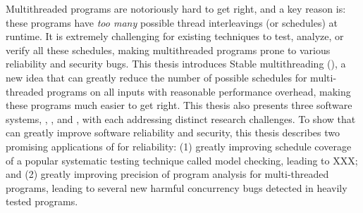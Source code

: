 Multithreaded programs are notoriously hard to get right, and a key reason is: these programs have \emph{too many} possible thread interleavings (or schedules) at runtime. It is extremely challenging for existing techniques to test, analyze, or verify all these schedules, making multithreaded programs prone to various reliability and security bugs. This thesis introduces Stable multithreading (\smt), a new idea that can greatly reduce the number of possible schedules for multi-threaded programs on all inputs with reasonable performance overhead, making these programs much easier to get right. This thesis also presents three \smt software systems, \tern, \peregrine, and \parrot, with each addressing distinct research challenges. To show that \smt can greatly improve software reliability and security, this thesis describes two promising applications of \smt for reliability: (1) greatly improving schedule coverage of a popular systematic testing technique called model checking, leading to XXX; and  (2) greatly improving precision of program analysis for multi-threaded programs, leading to several new harmful concurrency bugs detected in heavily tested programs.
